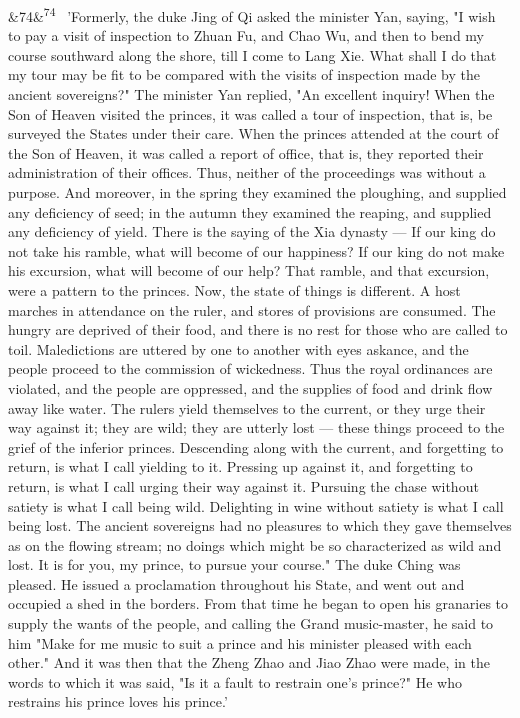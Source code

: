 \documentclass[12pt]{article}
\newcommand{\para}[1][]{\par\noindent\ifx&#1&\else\textsuperscript{\footnotesize #1}~\fi}
\begin{document}
\para[74] 'Formerly, the duke Jing of Qi asked the minister Yan, saying, "I wish to pay a visit of inspection to Zhuan Fu, and Chao Wu, and then to bend my course southward along the shore, till I come to Lang Xie. What shall I do that my tour may be fit to be compared with the visits of inspection made by the ancient sovereigns?" The minister Yan replied, "An excellent inquiry! When the Son of Heaven visited the princes, it was called a tour of inspection, that is, be surveyed the States under their care. When the princes attended at the court of the Son of Heaven, it was called a report of office, that is, they reported their administration of their offices. Thus, neither of the proceedings was without a purpose. And moreover, in the spring they examined the ploughing, and supplied any deficiency of seed; in the autumn they examined the reaping, and supplied any deficiency of yield. There is the saying of the Xia dynasty --- If our king do not take his ramble, what will become of our happiness? If our king do not make his excursion, what will become of our help? That ramble, and that excursion, were a pattern to the princes. Now, the state of things is different. A host marches in attendance on the ruler, and stores of provisions are consumed. The hungry are deprived of their food, and there is no rest for those who are called to toil. Maledictions are uttered by one to another with eyes askance, and the people proceed to the commission of wickedness. Thus the royal ordinances are violated, and the people are oppressed, and the supplies of food and drink flow away like water. The rulers yield themselves to the current, or they urge their way against it; they are wild; they are utterly lost --- these things proceed to the grief of the inferior princes. Descending along with the current, and forgetting to return, is what I call yielding to it. Pressing up against it, and forgetting to return, is what I call urging their way against it. Pursuing the chase without satiety is what I call being wild. Delighting in wine without satiety is what I call being lost. The ancient sovereigns had no pleasures to which they gave themselves as on the flowing stream; no doings which might be so characterized as wild and lost. It is for you, my prince, to pursue your course." The duke Ching was pleased. He issued a proclamation throughout his State, and went out and occupied a shed in the borders. From that time he began to open his granaries to supply the wants of the people, and calling the Grand music-master, he said to him "Make for me music to suit a prince and his minister pleased with each other." And it was then that the Zheng Zhao and Jiao Zhao were made, in the words to which it was said, "Is it a fault to restrain one's prince?" He who restrains his prince loves his prince.'
\end{document}
